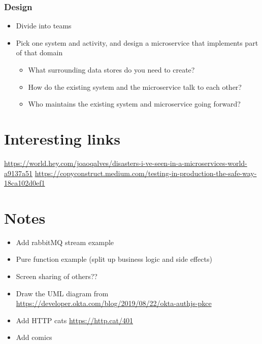 \documentclass[8pt]{article}
\begin{document}
\subsubsection{Design}
\label{sec:orgb0b30d4}
\begin{itemize}
\item Divide into teams

\item Pick one system and activity, and design a microservice that implements part of that domain
\begin{itemize}
\item What surrounding data stores do you need to create?
\item How do the existing system and the microservice talk to each other?
\item Who maintains the existing system and microservice going forward?
\end{itemize}
\end{itemize}

\section{Interesting links}
\label{sec:org09e1574}
\url{https://world.hey.com/joaoqalves/disasters-i-ve-seen-in-a-microservices-world-a9137a51}
\url{https://copyconstruct.medium.com/testing-in-production-the-safe-way-18ca102d0ef1}

\section{Notes}
\label{sec:org1a9371a}
\begin{itemize}
\item Add rabbitMQ stream example
\item Pure function example (split up business logic and side effects)
\item Screen sharing of others??

\item Draw the UML diagram from \url{https://developer.okta.com/blog/2019/08/22/okta-authjs-pkce}
\item Add HTTP cats \url{https://http.cat/401}
\item Add comics
\end{itemize}
\end{document}
